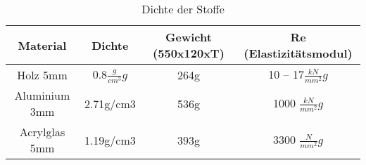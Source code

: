 \begin{table}[h!]
	\centering
	\caption{Dichte der Stoffe}

	\begin{tabular}{|c|c|c|c|}
		\hline Material & Dichte & Gewicht (550x120xT) & Re (Elastizitätsmodul) \\ 
		\hline Holz 5mm & 0.8$\frac{g}{cm^3}g$ & 264g & 10 – 17$\frac{kN}{mm^2}g$ \\ 
		\hline Aluminium 3mm & 2.71g/cm3 & 536g & 1000 $\frac{kN}{mm^2}g$ \\ 
		\hline Acrylglas 5mm & 1.19g/cm3 & 393g & 3300 $\frac{N}{mm^2}g$  \\ 
		\hline 
	\end{tabular} 
\end{table}
 		
 			

